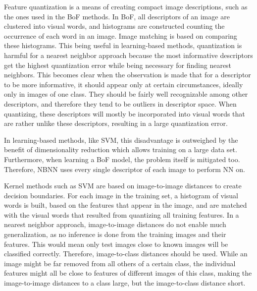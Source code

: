 \documentclass[a4paper,10pt]{article}
\begin{document}
Feature quantization is a means of creating compact image descriptions, such as the ones used in the BoF methods. In BoF, all descriptors of an image are clustered into visual words, and histograms are constructed counting the occurrence of each word in an image. Image matching is based on comparing these histograms. This being useful in learning-based methods, quantization is harmful for a nearest neighbor approach because the most informative descriptors get the highest quantization error while being necessary for finding nearest neighbors. This becomes clear when the observation is made that for a descriptor to be more informative, it should appear only at certain circumstances, ideally only in images of one class. They should be fairly well recognizable among other descriptors, and therefore they tend to be outliers in descriptor space. When quantizing, these descriptors will mostly be incorporated into visual words that are rather unlike these descriptors, resulting in a large quantization error.

In learning-based methods, like SVM, this disadvantage is outweighed by the benefit of dimensionality reduction which allows training on a large data set. Furthermore, when learning a BoF model, the problem itself is mitigated too. Therefore, NBNN uses every single descriptor of each image to perform NN on.

Kernel methods such as SVM are based on image-to-image distances to create decision boundaries. For each image in the training set, a histogram of visual words is built, based on the features that appear in the image, and are matched with the visual words that resulted from quantizing all training features. 
In a nearest neighbor approach, image-to-image distances do not enable much generalization, as no inference is done from the training images and their features. This would mean only test images close to known images will be classified correctly. Therefore, image-to-class distances should be used. While an image might be far removed from all others of a certain class, the individual features might all be close to features of different images of this class, making the image-to-image distances to a class large, but the image-to-class distance short. \cite{wang2009learning} 

\begin{figure}[hbt]
    \centering
\end{figure}
\end{document}
